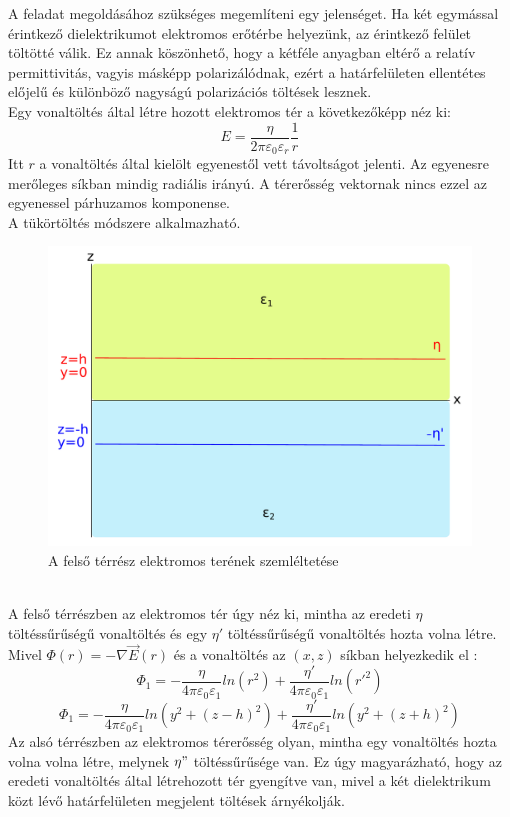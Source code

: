 \documentclass[11pt,a4paper,openany,leqno]{article}
\begin{document}
A feladat megoldásához szükséges megemlíteni egy jelenséget. Ha két egymással érintkező dielektrikumot elektromos erőtérbe helyezünk, az érintkező felület töltötté válik. Ez annak köszönhető, hogy a kétféle anyagban eltérő a relatív permittivitás, vagyis másképp polarizálódnak, ezért a határfelületen ellentétes előjelű és különböző nagyságú polarizációs töltések lesznek. \\ \indent
Egy vonaltöltés által létre hozott elektromos tér a következőképp néz ki:
$$E = \frac{\eta}{2 \pi \varepsilon_0 \varepsilon_r} \frac{1}{r} $$
\indent
Itt $r$ a vonaltöltés által kielölt egyenestől vett távoltságot jelenti. Az egyenesre merőleges síkban mindig radiális irányú. A térerősség vektornak nincs ezzel az egyenessel párhuzamos komponense.
\\ \indent
A tükörtöltés módszere alkalmazható. \\ \indent
\begin{figure}[h!]
\centering
  \includegraphics[width=120mm,scale=0.5]{beadando1_1.pdf}
  \caption{A felső térrész elektromos terének szemléltetése}
  \label{}
\end{figure} \\ \indent
A felső térrészben az elektromos tér úgy néz ki, mintha az eredeti $\eta$ töltéssűrűségű vonaltöltés és egy $\eta'$ töltéssűrűségű vonaltöltés hozta volna létre. Mivel $\Phi(r) = - \nabla \vec{E}(r)$ és a vonaltöltés az $(x,z)$ síkban helyezkedik el : 
$$ \Phi_1 = -\frac{\eta}{4 \pi \varepsilon_0 \varepsilon_1} ln(r^2) + \frac{\eta'}{4 \pi \varepsilon_0 \varepsilon_1} ln(r'^2) $$
$$\Phi_1 = -\frac{\eta}{4 \pi \varepsilon_0 \varepsilon_1} ln(y^2 + (z-h)^2) + \frac{\eta'}{4 \pi \varepsilon_0 \varepsilon_1} ln(y^2 + (z+h)^2)$$
\indent
Az alsó térrészben az elektromos térerősség olyan, mintha egy vonaltöltés hozta volna volna létre, melynek $\eta"$ töltéssűrűsége van. Ez úgy magyarázható, hogy az eredeti vonaltöltés által létrehozott tér gyengítve van, mivel a két dielektrikum közt lévő határfelületen megjelent töltések árnyékolják.\\
\end{document}
